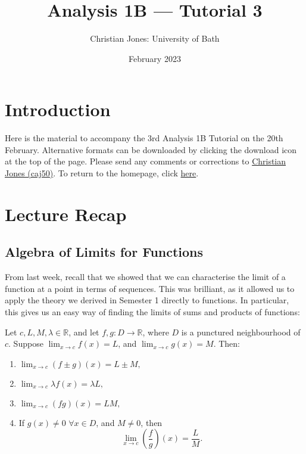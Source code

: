 \documentclass[
  12pt,
  a4paper]{extarticle}
\title{Analysis 1B --- Tutorial 3}
\author{Christian Jones: University of Bath}
\date{February 2023}
\theoremstyle{plain}
\theoremstyle{definition}
\theoremstyle{plain}
\theoremstyle{plain}
\theoremstyle{plain}
\theoremstyle{plain}
\theoremstyle{definition}
\theoremstyle{definition}
\theoremstyle{remark}
\theoremstyle{remark}
\let\BeginKnitrBlock\begin \let\EndKnitrBlock\end
\renewcommand{\;}{\,}
\begin{document}
\maketitle

{
\setcounter{tocdepth}{2}
\tableofcontents
}
\newpage
{}

\hypertarget{introduction}{%
\section*{Introduction}\label{introduction}}

Here is the material to accompany the 3rd Analysis 1B Tutorial on the 20th February. Alternative formats can be downloaded by clicking the download icon at the top of the page. Please send any comments or corrections to \href{mailto:caj50@bath.ac.uk}{Christian Jones (caj50)}. To return to the homepage, click \href{http://caj50.github.io/tutoring.html}{here}.

\hypertarget{lecture-recap}{%
\section{Lecture Recap}\label{lecture-recap}}

\hypertarget{algebra-of-limits-for-functions}{%
\subsection{Algebra of Limits for Functions}\label{algebra-of-limits-for-functions}}

From last week, recall that we showed that we can characterise the limit of a function at a point in terms of sequences. This was brilliant, as it allowed us to apply the theory we derived in Semester 1 directly to functions. In particular, this gives us an easy way of finding the limits of sums and products of functions:

\BeginKnitrBlock{theorem}[Algebra of Limits]
{\label{thm:thm1} }Let \(c, L, M, \lambda \in \mathbb{R}\), and let \(f,g: D \to \mathbb{R}\), where \(D\) is a punctured neighbourhood of \(c\). Suppose \(\lim_{x \to c}f(x) = L\), and \(\lim_{x \to c}g(x) = M\). Then:

\begin{enumerate}
\def\labelenumi{\arabic{enumi}.}
\item
  \(\lim_{x\to c}\left(f \pm g\right)(x) = L \pm M,\)
\item
  \(\lim_{x \to c}\lambda f(x) = \lambda L,\)
\item
  \(\lim_{x \to c}(fg)(x) = LM,\)
\item
  If \(g(x) \neq 0 \;\;\forall x \in D\), and \(M \neq 0\), then \[\lim_{x \to c}\left(\frac{f}{g}\right)(x) = \frac{L}{M}.\]
\end{enumerate}
\EndKnitrBlock{theorem}
\end{document}
